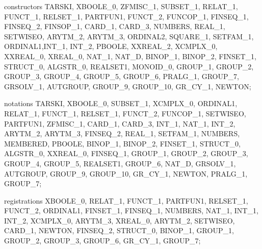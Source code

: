\nwenddocs{}\endmoddef\nwstartdeflinemarkup{}\nwenddeflinemarkup
 constructors TARSKI, XBOOLE_0, ZFMISC_1, SUBSET_1, RELAT_1, FUNCT_1,
   RELSET_1, PARTFUN1, FUNCT_2, FUNCOP_1, FINSEQ_1, FINSEQ_2, FINSOP_1,
   CARD_1, CARD_3, NUMBERS, REAL_1, SETWISEO,
   ARYTM_2, ARYTM_3, ORDINAL2, SQUARE_1,
   SETFAM_1, ORDINAL1,INT_1, INT_2, PBOOLE,
   XXREAL_2, XCMPLX_0, XXREAL_0, XREAL_0,  NAT_1, NAT_D,
   BINOP_1, BINOP_2, FINSET_1, STRUCT_0, ALGSTR_0, REALSET1, MONOID_0,
   GROUP_1, GROUP_2, GROUP_3, GROUP_4, GROUP_5, GROUP_6, PRALG_1, GROUP_7, GRSOLV_1,
   AUTGROUP, GROUP_9, GROUP_10, GR_CY_1, NEWTON;
\nwendcode{}\nwdocspar

\nwenddocs{}\endmoddef\nwstartdeflinemarkup{}\nwenddeflinemarkup
 notations TARSKI, XBOOLE_0, SUBSET_1, XCMPLX_0, ORDINAL1, RELAT_1,
   FUNCT_1, RELSET_1, FUNCT_2, FUNCOP_1, SETWISEO, PARTFUN1,
   ZFMISC_1, CARD_1, CARD_3, INT_1, NAT_1, INT_2, ARYTM_2, ARYTM_3,
   FINSEQ_2, REAL_1, SETFAM_1, NUMBERS, MEMBERED, PBOOLE, BINOP_1,
   BINOP_2, FINSET_1, STRUCT_0, ALGSTR_0, XXREAL_0, FINSEQ_1, GROUP_1, GROUP_2,
   GROUP_3, GROUP_4, GROUP_5, REALSET1, GROUP_6, NAT_D, GRSOLV_1,
   AUTGROUP, GROUP_9, GROUP_10, GR_CY_1, NEWTON, PRALG_1, GROUP_7;
\nwendcode{}\nwdocspar

\nwenddocs{}\endmoddef\nwstartdeflinemarkup{}\nwenddeflinemarkup
 registrations XBOOLE_0, RELAT_1, FUNCT_1, PARTFUN1, RELSET_1, FUNCT_2,
   ORDINAL1, FINSET_1, FINSEQ_1, NUMBERS, NAT_1, INT_1, INT_2, XCMPLX_0,
   ARYTM_3, XREAL_0, ARYTM_2, SETWISEO, CARD_1, NEWTON, FINSEQ_2,
   STRUCT_0, BINOP_1, GROUP_1, GROUP_2, GROUP_3, GROUP_6, GR_CY_1, GROUP_7;
\nwendcode{}\nwdocspar

